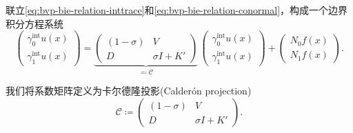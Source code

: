 联立\eqref{eq:bvp-bie-relation-inttrace}和\eqref{eq:bvp-bie-relation-conormal}，构成一个边界积分方程系统
\begin{equation}
  \label{eq:bvp-bie-system}
  \begin{pmatrix}
    \gamma_{0}^{\text{int}} u(x) \\
    \gamma_{1}^{\text{int}} u(x)
  \end{pmatrix}
  =
  \underbrace{
  \begin{pmatrix}
    \left( 1-\sigma \right) & V \\
    D & \sigma I + K'
  \end{pmatrix}
  }_{\eqqcolon \mathcal{C}}
  \,
  \begin{pmatrix}
    \gamma_{0}^{\text{int}} u(x)\\
    \gamma_{1}^{\text{int}} u(x)
  \end{pmatrix}
  +
  \begin{pmatrix}
    N_{0} f(x) \\
    N_{1} f(x)
  \end{pmatrix}.
\end{equation}

我们将系数矩阵定义为卡尔德隆投影(Calderón projection)
\begin{equation}
  \label{eq:bvp-bie-system-calderon-projection}
  \mathcal{C} \coloneqq
  \begin{pmatrix}
    \left( 1-\sigma \right) & V \\
    D & \sigma I + K'
  \end{pmatrix}.
\end{equation}

